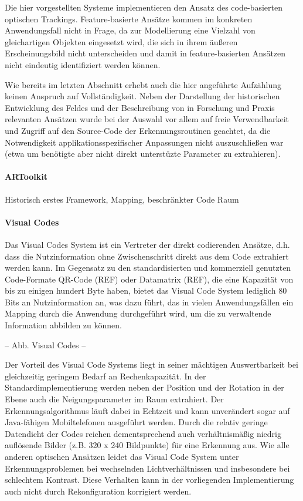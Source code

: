 Die hier vorgestellten Systeme implementieren den Ansatz des code-basierten optischen Trackings. Feature-basierte Ansätze kommen im konkreten Anwendungsfall nicht in Frage, da zur Modellierung eine Vielzahl von gleichartigen Objekten eingesetzt wird, die sich in ihrem äußeren Erscheinungsbild nicht unterscheiden und damit in feature-basierten Ansätzen nicht eindeutig identifiziert werden können.

Wie bereits im letzten Abschnitt erhebt auch die hier angeführte Aufzählung keinen Anspruch auf Vollständigkeit. Neben der Darstellung der historischen Entwicklung des Feldes und der Beschreibung von in Forschung und Praxis relevanten Ansätzen wurde bei der Auswahl vor allem auf freie Verwendbarkeit und Zugriff auf den Source-Code der Erkennungsroutinen geachtet, da die Notwendigkeit applikationsspezifischer Anpassungen nicht auszuschließen war (etwa um benötigte aber nicht direkt unterstüzte Parameter zu extrahieren).

\paragraph{ARToolkit}\label{par:artoolkit}
Historisch erstes Framework, Mapping, beschränkter Code Raum


\paragraph{Visual Codes}\label{par:visualcodes}

Das Visual Codes System ist ein Vertreter der direkt codierenden Ansätze, d.h. dass die Nutzinformation ohne Zwischenschritt direkt aus dem Code extrahiert werden kann. Im Gegensatz zu den standardisierten und kommerziell genutzten Code-Formate QR-Code (REF) oder Datamatrix (REF), die eine Kapazität von bis zu einigen hundert Byte haben, bietet das Visual Code System lediglich 80 Bits an Nutzinformation an, was dazu führt, das in vielen Anwendungsfällen ein Mapping durch die Anwendung durchgeführt wird, um die zu verwaltende Information abbilden zu können.

-- Abb. Visual Codes --

Der Vorteil des Visual Code Systems liegt in seiner mächtigen Auswertbarkeit bei gleichzeitig geringem Bedarf an Rechenkapazität. In der Standardimplementierung werden neben der Position und der Rotation in der Ebene auch die Neigungsparameter im Raum extrahiert. Der Erkennungsalgorithmus läuft dabei in Echtzeit und kann unverändert sogar auf Java-fähigen Mobiltelefonen ausgeführt werden. Durch die relativ geringe Datendicht der Codes reichen dementsprechend auch verhältnismäßig niedrig auflösende Bilder (z.B. 320 x 240 Bildpunkte) für eine Erkennung aus. Wie alle anderen optischen Ansätzen leidet das Visual Code System unter Erkennungsproblemen bei wechselnden Lichtverhältnissen und insbesondere bei schlechtem Kontrast. Diese Verhalten kann in der vorliegenden Implementierung auch nicht durch Rekonfiguration korrigiert werden.

